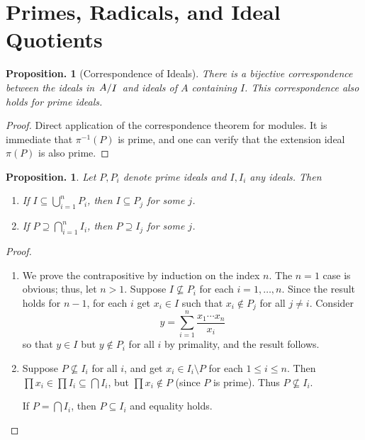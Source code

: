 \documentclass[11pt, a4paper]{memoir}
\theoremstyle{change}
\newtheorem{proposition}[theorem]{Proposition.}
\theoremstyle{plain}
\theoremstyle{nonumberplain}
\newtheorem{proof}{Proof}
\newcommand{\quot}[2]{\mathchoice{\left.\raisebox{0.10em}{$#1$}\middle/\raisebox{-0.10em}{$#2$}\right.}
                                 {\left.\raisebox{0.04em}{$#1$}\middle/\raisebox{-0.04em}{$#2$}\right.}
                                 {\left.\raisebox{0.01em}{$#1$}\middle/\raisebox{-0.01em}{$#2$}\right.}
                                 {\left.\raisebox{0em}{$#1$}\middle/\raisebox{0em}{$#2$}\right.}}
\numberwithin{equation}{section}
\begin{document}
\section{Primes, Radicals, and Ideal Quotients}
\begin{proposition}[Correspondence of Ideals]
    There is a bijective correspondence between the ideals in $\quot{A}{I}$ and ideals of $A$ containing $I$.
    This correspondence also holds for prime ideals.
\end{proposition}
\begin{proof}
    Direct application of the correspondence theorem for modules.
    It is immediate that $\pi^{-1}(P)$ is prime, and one can verify that the extension ideal $\pi(P)$ is also prime.
\end{proof}
\begin{proposition}\label{prop:p-int}
    Let $P,P_i$ denote prime ideals and $I,I_i$ any ideals.
    Then
    \begin{enumerate}[nl,r]
        \item If $I\subseteq\bigcup_{i=1}^n P_i$, then $I\subseteq P_j$ for some $j$.
        \item If $P\supseteq \bigcap_{i=1}^n I_i$, then $P\supseteq I_j$ for some $j$.
    \end{enumerate}
\end{proposition}
\begin{proof}
    \begin{enumerate}[nl,r]
        \item We prove the contrapositive by induction on the index $n$.
            The $n=1$ case is obvious; thus, let $n>1$.
            Suppose $I\not\subseteq P_i$ for each $i=1,\ldots,n$.
            Since the result holds for $n-1$, for each $i$ get $x_i\in I$ such that $x_i\notin P_j$ for all $j\neq i$.
            Consider
            \begin{equation*}
                y=\sum_{i=1}^n\frac{x_1\cdots x_n}{x_i}
            \end{equation*}
            so that $y\in I$ but $y\notin P_i$ for all $i$ by primality, and the result follows.
        \item Suppose $P\not\subseteq I_i$ for all $i$, and get $x_i\in I_i\setminus P$ for each $1\leq i\leq n$.
            Then $\prod x_i\in\prod I_i\subseteq\bigcap I_i$, but $\prod x_i\notin P$ (since $P$ is prime).
            Thus $P\not\subseteq I_i$.

            If $P=\bigcap I_i$, then $P\subseteq I_i$ and equality holds.
    \end{enumerate}
\end{proof}
\end{document}
